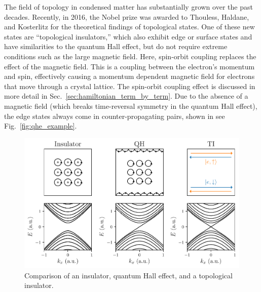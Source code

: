 The field of topology in condensed matter has substantially grown over the past decades.
Recently, in 2016, the Nobel prize was awarded to Thouless, Haldane, and Kosterlitz for the theoretical findings of topological states.
One of these new states are ``topological insulators,'' which also exhibit edge or surface states and have similarities to the quantum Hall effect, but do not require extreme conditions such as the large magnetic field.
Here, spin-orbit coupling replaces the effect of the magnetic field.
This is a coupling between the electron's momentum and spin, effectively causing a momentum dependent magnetic field for electrons that move through a crystal lattice.
The spin-orbit coupling effect is discussed in more detail in Sec.~\ref{sec:hamiltonian_term_by_term}.
Due to the absence of a magnetic field (which breaks time-reversal symmetry in the quantum Hall effect), the edge states always come in counter-propagating pairs, shown in see Fig.~\ref{fig:qhe_example}.

\begin{figure}[!htb]
\begin{center}
\includegraphics{chapter_introduction/figures/compare-insulators.pdf}
\caption{
Comparison of an insulator, quantum Hall effect, and a topological insulator.
\label{fig:qhe}}
\end{center}
\end{figure}

